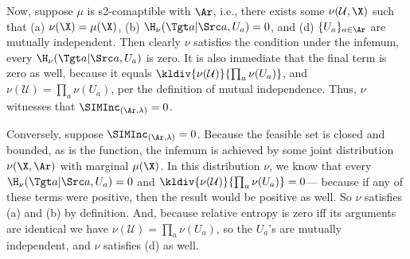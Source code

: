 \begin{subappendices}
\begin{lproof}
    Now, suppose $\mu$ is s2-comaptible with $\Ar$, i.e., there exists
    some $\nu(\mathcal U, \X)$ such that 
    (a) $\nu(\X) = \mu(\X)$,
    (b) $\H_\nu(\Tgt a | \Src a, U_a) = 0$,
    and (d) $\{U_a\}_{a \in \Ar}$ are mutually independent.
    Then clearly $\nu$ satisfies the condition under the infemum,
    every $\H_\nu(\Tgt a | \Src a, U_a)$ is zero.
    It is also immediate that the final term is zero as well, because it equals
    $\kldiv{\nu(\mathcal U)}{\prod_a \nu(U_a)}$, and 
    $\nu(\mathcal U) = \prod_a \nu(U_a)$, per the definition of mutual independence.
    Thus, $\nu$ witnesses that $\SIMInc_{(\Ar, \lambda)} = 0$. 
    
    Conversely, suppose $\SIMInc_{(\Ar, \lambda)} = 0$.
    Because the feasible set is closed and bounded, as is the function,
    the infemum is achieved by some joint distribution $\nu(\X, \Ar)$ with marginal $\mu(\X)$.
    In this distribution $\nu$, we know that every $\H_\nu(\Tgt a | \Src a, U_a) = 0$
    and $\kldiv{\nu(\mathcal U)}{\prod_a \nu(U_a)} = 0$---
    because if any of these terms were positive, then the result
        would be positive as well.
    So $\nu$ satisfies (a) and (b) by definition. 
    And, because relative entropy is zero iff its arguments are identical
        we have $\nu(\mathcal U) = \prod_a \nu(U_a)$, so the $U_a$'s are mutually
        independent, and $\nu$ satisfies (d) as well.
\end{lproof}



\end{subappendices}
